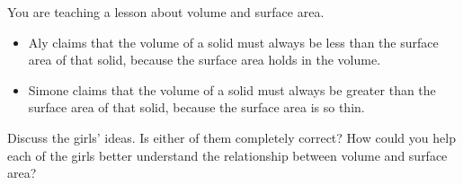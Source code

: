 \documentclass[nooutcomes]{ximera}
\begin{document}
\newpage
\begin{problem}
You are teaching a lesson about volume and surface area.
    \begin{itemize}
        \item Aly claims that the volume of a solid must always be less than the surface area of that solid, because the surface area holds in the volume.
        \item Simone claims that the volume of a solid must always be greater than the surface area of that solid, because the surface area is so thin.
    \end{itemize}
    Discuss the girls' ideas.  Is either of them completely correct?  How could you help each of the girls better understand the relationship between volume and surface area?
\end{problem}
\end{document}
